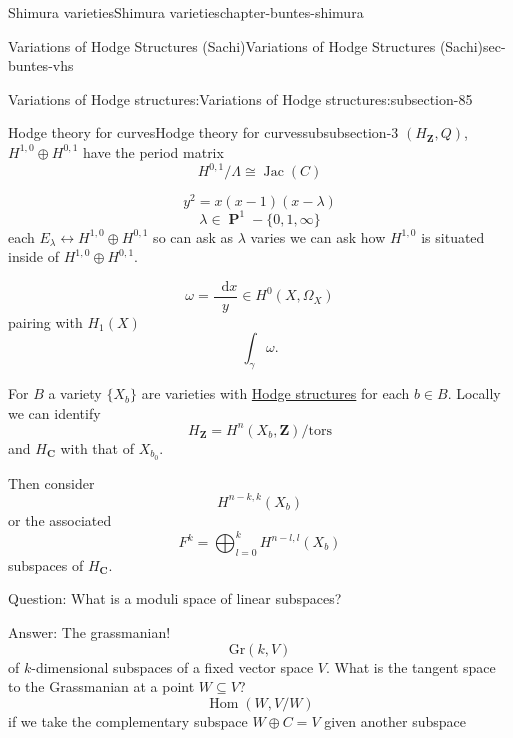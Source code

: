 \documentclass[oneside,10pt,]{book}
\numberwithin{equation}{section}
\newcommand{\diff}{\mathop{}\!\mathrm{d}}
\newcommand{\ZZ}{\mathbf{Z}}
\newcommand{\CC}{\mathbf{C}}
\newcommand{\tors}{\mathrm{tors}}
\DeclareMathOperator{\Hom}{Hom}
\DeclareMathOperator{\Jac}{Jac}
\DeclareMathOperator{\PP}{\mathbf{P}}
\begin{document}
\begin{chapterptx}{Shimura varieties}{}{Shimura varieties}{}{}{chapter-buntes-shimura}
\begin{sectionptx}{Variations of Hodge Structures (Sachi)}{}{Variations of Hodge Structures (Sachi)}{}{}{sec-buntes-vhs}
\begin{subsectionptx}{Variations of Hodge structures:}{}{Variations of Hodge structures:}{}{}{subsection-85}
\begin{subsubsectionptx}{Hodge theory for curves}{}{Hodge theory for curves}{}{}{subsubsection-3}
\hypertarget{p-1158}{}%
\((H_\ZZ, Q)\), \(H^{1,0} \oplus H^{0,1}\) have the period matrix%
\begin{equation*}
H^{0,1}/\Lambda \cong \Jac(C)
\end{equation*}
%
\par
\hypertarget{p-1159}{}%
%
\begin{equation*}
y^2 = x(x-1)(x-\lambda)
\end{equation*}
%
\begin{equation*}
\lambda \in \PP^1 - \{0,1,\infty\}
\end{equation*}
each \(E_\lambda \leftrightarrow H^{1,0} \oplus H^{0,1}\) so can ask as \(\lambda\) varies we can ask how \(H^{1,0}\) is situated inside of \(H^{1,0} \oplus H^{0,1}\).%
\par
\hypertarget{p-1160}{}%
%
\begin{equation*}
\omega = \frac{\diff x}{y} \in H^0(X,\Omega_X)
\end{equation*}
pairing with \(H_1(X)\)%
\begin{equation*}
\int_\gamma \omega\text{.}
\end{equation*}
%
\par
\hypertarget{p-1161}{}%
For \(B\) a variety \(\{X_b\}\) are varieties with \hyperref[def-hodge-str]{Hodge structures} for each \(b\in B\). Locally we can identify%
\begin{equation*}
H_\ZZ = H^n(X_b , \ZZ)/\tors
\end{equation*}
and \(H_\CC \) with that of \(X_{b_0}\).%
\par
\hypertarget{p-1162}{}%
Then consider%
\begin{equation*}
H^{n-k, k}(X_b)
\end{equation*}
or the associated%
\begin{equation*}
F^k = \bigoplus_{l=0}^k H^{n-l,l}(X_b)
\end{equation*}
subspaces of \(H_\CC\).%
\par
\hypertarget{p-1163}{}%
Question: What is a moduli space of linear subspaces?%
\par
\hypertarget{p-1164}{}%
Answer: The grassmanian!%
\begin{equation*}
{\mathrm{Gr}}(k,V)
\end{equation*}
of \(k\)-dimensional subspaces of a fixed vector space \(V\). What is the tangent space to the Grassmanian at a point \(W\subseteq V\)?%
\begin{equation*}
\Hom(W, V/W)
\end{equation*}
if we take the complementary subspace \(W  \oplus C = V\) given another subspace%

\end{subsubsectionptx}
\end{subsectionptx}
\end{sectionptx}
\end{chapterptx}
\end{document}
